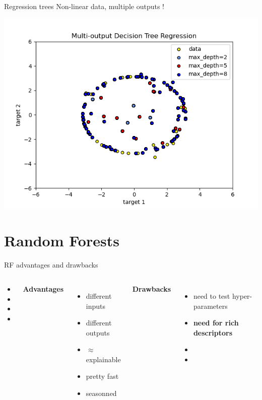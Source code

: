 \documentclass{irdbeamer}
\begin{document}
\begin{frame}{Regression trees}
\centering
Non-linear data, multiple outputs !

    \includegraphics[width=.5\textwidth]{./figs/non-linear.png}%
\end{frame}


\section{Random Forests}

\begin{frame}{}
\end{frame}



\begin{frame}{RF advantages and drawbacks}
\begin{columns}
\begin{column}{0.05\textwidth}
\begin{itemize}
    \item[] 
    \item[] 
    \item[] 
    \item[] 
\end{itemize}
\end{column}
        \textbf{Advantages}
        \begin{itemize}
            \item<1-> different inputs
            \item<2-> different outputs
            \item<3-> $\approx$ explainable
            \item<4-> pretty fast
            \item<5-> seasonned
        \end{itemize}
        \textbf{Drawbacks}
        \begin{itemize}
            \item<6-> need to test hyper-parameters
            \item<7-> \textbf{need for rich descriptors}
            \item[] 
            \item[] 
        \end{itemize}
\end{columns}
\end{frame}
\end{document}
